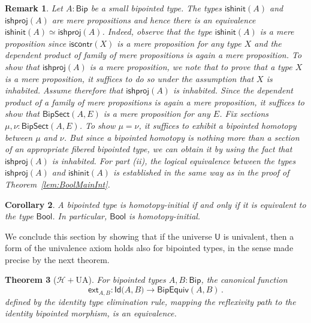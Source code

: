 \documentclass[reqno,10pt,a4paper,oneside]{amsart}
\numberwithin{equation}{section}
\theoremstyle{mythm}
\newtheorem{theorem}{Theorem}[section]
\newtheorem{corollary}[theorem]{Corollary}
\theoremstyle{mydef}
\theoremstyle{myrmk}
\newtheorem{remark}[theorem]{Remark}
\newcommand{\co}{\colon}
\newcommand{\Hint}{\mathcal{H}}
\newcommand{\iscontr}{\mathsf{iscontr}}
\newcommand{\ext}{\mathsf{ext}}
\newcommand{\Id}{\mathsf{Id}}
\newcommand{\Bool}{\mathsf{Bool}}
\newcommand{\UU}{\mathsf{U}}
\newcommand{\Bip}{\mathsf{Bip}}
\newcommand{\BipSect}{\mathsf{BipSect}}
\newcommand{\ishinit}{\mathsf{ishinit}}
\newcommand{\ishproj}{\mathsf{ishproj}}
\newcommand{\BipEquiv}{\mathsf{BipEquiv}}
\begin{document}
\begin{remark}\label{lem:BoolMainInternal} Let   $A: \Bip$ be a small bipointed type.
 The types $\ishinit(A)$ and $\ishproj(A)$ are mere
propositions and hence there is an equivalence $\ishinit(A)  \simeq   \ishproj(A)$.
Indeed, observe that
the type $\ishinit(A)$ is a mere proposition since $\iscontr(X)$ is a mere proposition for any type $X$ and the dependent product of family of mere propositions is again a mere proposition. To show that $\ishproj (A)$ is a mere proposition, we note that to prove that a type $X$ is a mere proposition, it suffices to do so under the assumption that $X$ is inhabited. Assume therefore that $\ishproj(A)$ is inhabited. Since the dependent product of a family of mere propositions is again a mere proposition, it suffices to show that $\BipSect(A,E)$ is a mere proposition for any $E$. Fix sections $\mu, \nu : \BipSect(A,E)$. To show $\mu = \nu$, it suffices to exhibit a bipointed homotopy between $\mu$ and $\nu$. But since a bipointed homotopy is nothing more than a section of an appropriate fibered bipointed type, we can obtain it by using the fact that $\ishproj(A)$ is inhabited.
For part (ii), the logical equivalence between the types $\ishproj(A)$ and 
$\ishinit(A)$ is established in the same way as in the proof of  Theorem~\ref{lem:BoolMainInt}. 
\end{remark}


\begin{corollary}\label{lem:BoolInitInt}
A bipointed type is homotopy-initial if and only if it is equivalent to the type $\Bool$. In particular, $\Bool$ is homotopy-initial.
\end{corollary}




We conclude this section by showing that if the universe $\UU$ is univalent, then a form of the univalence axiom holds also for bipointed types, in the sense made precise by the next theorem.


\begin{theorem}[$\Hint + \mathrm{UA}$] \label{thm:bipunivalence}
For bipointed types $A, B : \Bip$, the canonical function
\[ 
\ext_{A,B} \co \Id \big(A,B\big) \to  \BipEquiv(A,B) \, .
\] 
defined by the identity type elimination rule, mapping the reflexivity path to the identity bipointed morphism, 
is an equivalence.
\end{theorem} 
\end{document}
